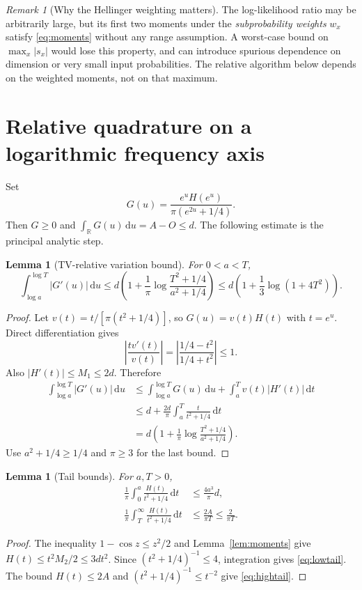 \documentclass[11pt]{article}
\newtheorem{lemma}[theorem]{Lemma}
\theoremstyle{definition}
\theoremstyle{remark}
\newtheorem{remark}[theorem]{Remark}
\newcommand{\dd}{\,\mathrm d}
\newcommand{\R}{\mathbb R}
\begin{document}
\begin{remark}[Why the Hellinger weighting matters]
The log-likelihood ratio may be arbitrarily large, but its first two moments under the \emph{subprobability weights} $w_x$ satisfy \eqref{eq:moments} without any range assumption. A worst-case bound on $\max_x|s_x|$ would lose this property, and can introduce spurious dependence on dimension or very small input probabilities. The relative algorithm below depends on the weighted moments, not on that maximum.
\end{remark}

\section{Relative quadrature on a logarithmic frequency axis}
\label{sec:relative}

Set
\begin{equation}
 G(u)=\frac{e^u H(e^u)}{\pi(e^{2u}+1/4)}.
 \label{eq:G}
\end{equation}
Then $G\ge0$ and $\int_{\R}G(u)\dd u=A-O\le d$.
The following estimate is the principal analytic step.

\begin{lemma}[TV-relative variation bound]
\label{lem:variation}
For $0<a<T$,
\begin{equation}
 \int_{\log a}^{\log T}|G'(u)|\dd u
 \le d\left(1+\frac1\pi
          \log\frac{T^2+1/4}{a^2+1/4}\right)
 \le d\left(1+\frac13\log(1+4T^2)\right).
 \label{eq:variation}
\end{equation}
\end{lemma}
\begin{proof}
Let $v(t)=t/[\pi(t^2+1/4)]$, so $G(u)=v(t)H(t)$ with $t=e^u$. Direct differentiation gives
\[
 \left|\frac{tv'(t)}{v(t)}\right|
 =\left|\frac{1/4-t^2}{1/4+t^2}\right|\le1.
\]
Also $|H'(t)|\le M_1\le2d$. Therefore
\begin{align*}
 \int_{\log a}^{\log T}|G'(u)|\dd u
 &\le\int_{\log a}^{\log T}G(u)\dd u
       +\int_a^T v(t)|H'(t)|\dd t\\
 &\le d+\frac{2d}{\pi}\int_a^T\frac{t}{t^2+1/4}\dd t\\
 &=d\left(1+\frac1\pi\log\frac{T^2+1/4}{a^2+1/4}\right).
\end{align*}
Use $a^2+1/4\ge1/4$ and $\pi\ge3$ for the last bound.
\end{proof}

\begin{lemma}[Tail bounds]
\label{lem:tails}
For $a,T>0$,
\begin{align}
 \frac1\pi\int_0^a\frac{H(t)}{t^2+1/4}\dd t
 &\le\frac{4a^3}{\pi}d,
 \label{eq:lowtail}\\
 \frac1\pi\int_T^\infty\frac{H(t)}{t^2+1/4}\dd t
 &\le\frac{2A}{\pi T}\le\frac2{\pi T}.
 \label{eq:hightail}
\end{align}
\end{lemma}
\begin{proof}
The inequality $1-\cos z\le z^2/2$ and Lemma~\ref{lem:moments} give $H(t)\le t^2M_2/2\le3dt^2$. Since $(t^2+1/4)^{-1}\le4$, integration gives \eqref{eq:lowtail}. The bound $H(t)\le2A$ and $(t^2+1/4)^{-1}\le t^{-2}$ give \eqref{eq:hightail}.
\end{proof}
\end{document}
